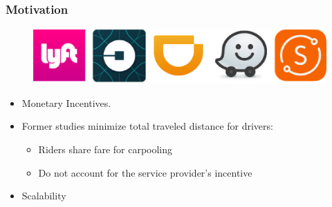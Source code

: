 \documentclass[t]{beamer}
\begin{document}
\begin{frame}\frametitle{Motivation}
\vspace{-0.28in}
\begin{figure}
	\centering
    \includegraphics[width = 0.55\columnwidth]{ride-sharings.eps}
\end{figure}
\vspace{-0.23in}
\begin{itemize}
\item Monetary Incentives.
\item Former studies minimize total traveled distance for drivers:
\begin{itemize}
\item Riders share fare for carpooling
\item Do not account for the service provider's incentive
\end{itemize}
\item Scalability
\end{itemize}
\end{frame}
\end{document}
